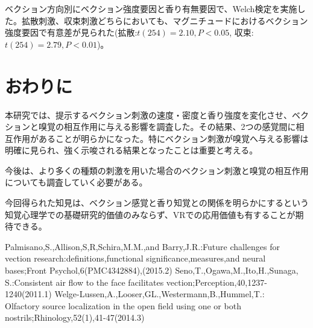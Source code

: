 \documentclass[uplatex]{jsarticle}   %
\begin{document}
ベクション方向別にベクション強度要因と香り有無要因で、Welch検定を実施した。拡散刺激、収束刺激どちらにおいても、マグニチュードにおけるベクション強度要因で有意差が見られた(拡散:$t(254)=2.10, P<0.05$, 収束:$t(254)=2.79, P<0.01$)。

\section{おわりに}
本研究では、提示するベクション刺激の速度・密度と香り強度を変化させ、ベクションと嗅覚の相互作用に与える影響を調査した。その結果、2つの感覚間に相互作用があることが明らかになった。特にベクション刺激が嗅覚へ与える影響は明確に見られ、強く示唆される結果となったことは重要と考える。

今後は、より多くの種類の刺激を用いた場合のベクション刺激と嗅覚の相互作用についても調査していく必要がある。

今回得られた知見は、ベクション感覚と香り知覚との関係を明らかにするという知覚心理学での基礎研究的価値のみならず、VRでの応用価値も有することが期待できる。




\begin{thebibliography}{99}
  Palmisano,S.,Allison,S,R,Schira,M.M.,and Barry,J.R.:Future challenges for vection research:definitions,functional significance,measures,and neural bases;Front Psychol,6(PMC4342884),(2015.2)
  Seno,T.,Ogawa,M.,Ito,H.,Sunaga, S.:Consistent air flow to the face facilitates vection;Perception,40,1237-1240(2011.1)
  Welge-Lussen,A.,Looser,GL.,Westermann,B.,Hummel,T.:\\Olfactory source localization in the open field using one or both nostrils;Rhinology,52(1),41-47(2014.3)
\end{thebibliography}
 
%
%
\end{document}
